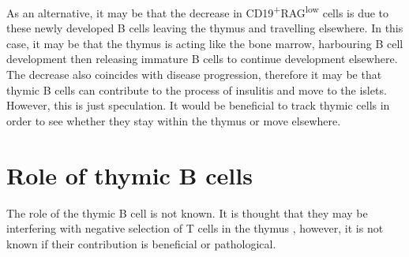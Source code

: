 As an alternative, it may be that the decrease in CD19\textsuperscript{+}RAG\textsuperscript{low} cells is due to these newly developed B cells leaving the thymus and travelling elsewhere.
In this case, it may be that the thymus is acting like the bone marrow, harbouring B cell development then releasing immature B cells to continue development elsewhere.
The decrease also coincides with disease progression, therefore it may be that thymic B cells can contribute to the process of insulitis and move to the islets.
However, this is just speculation.
It would be beneficial to track thymic cells in order to see whether they stay within the thymus or move elsewhere.









\section{Role of thymic B cells}

The role of the thymic B cell is not known.
It is thought that they may be interfering with negative selection of T cells in the thymus \citep{Frommer2010, Yamano2015}, however, it is not known if their contribution is beneficial or pathological.

